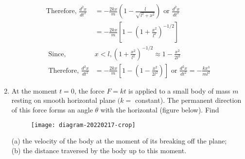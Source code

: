 \begin{enumerate}
\begin{answer}
\begin{align*}
	\text{Therefore, }\frac{d^{2} x}{d t^{2}}&=-\frac{2 k x}{m}\left(1-\frac{l}{\sqrt{l^{2}+x^{2}}}\right)\text{ or }\frac{d^{2} x}{d t^{2}}\\&=-\frac{2 k x}{m}\left[1-\left(1+\frac{x^{2}}{l^{2}}\right)^{-1 / 2}\right]\\
\text{	Since, }&x<l,\left(1+\frac{x^{2}}{l^{2}}\right)^{-1 / 2} \approx 1-\frac{x^{2}}{2 l^{2}}\\
\text{	Therefore, }\frac{d^{2} x}{d t^{2}}&=-\frac{2 k x}{m}\left[1-\left(1-\frac{x^{2}}{2 l^{2}}\right)\right]\text{ or }\frac{d^{2} x}{d t^{2}}=-\frac{k x^{3}}{m l^{2}}
		\end{align*}
	\end{answer}
\item At the moment $t=0$, the force $F=k t$ is applied to a small body of mass $m$ resting on smooth horizontal plane $(k=$ constant). The permanent direction of this force forms an angle $\theta$ with the horizontal (figure below). Find\\
\begin{figure}[H]
	\centering
	\texttt{[image: diagram-20220217-crop]}
\end{figure}
(a) the velocity of the body at the moment of its breaking off the plane;\\
(b) the distance traversed by the body up to this moment.


\end{enumerate}
